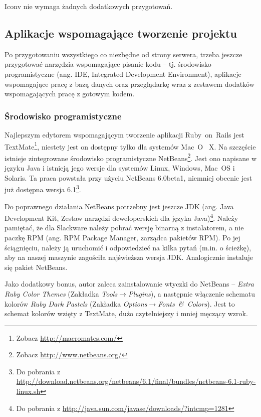 \documentclass[a4paper,12pt,oneside]{report}
\begin{document}
Iconv nie wymaga żadnych dodatkowych przygotowań.

\subsection{Aplikacje wspomagające tworzenie projektu}
\label{sub:ide}
Po przygotowaniu wszystkiego co niezbędne od strony serwera, trzeba jeszcze przygotować narzędzia wspomagające pisanie kodu -- tj. środowisko programistyczne (ang. IDE, Integrated Development Environment), aplikacje wspomagające pracę z bazą danych oraz przeglądarkę wraz z zestawem dodatków wspomagających pracę z gotowym kodem.

\subsubsection{Środowisko programistyczne}
\label{subsub:ide}
Najlepszym edytorem wspomagającym tworzenie aplikacji Ruby~on~Rails jest TextMate\footnote{Zobacz \url{http://macromates.com/}}, niestety jest on dostępny tylko dla systemów Mac~O~ X. Na szczęście istnieje zintegrowane środowisko programistyczne NetBeans\footnote{Zobacz \url{http://www.netbeans.org/}}. Jest ono napisane w języku Java i istnieją jego wersje dla systemów Linux, Windows, Mac~OS i Solaris. Ta praca powstała przy użyciu NetBeans 6.0beta1, niemniej obecnie jest już dostępna wersja 6.1\footnote{Do pobrania z \url{http://download.netbeans.org/netbeans/6.1/final/bundles/netbeans-6.1-ruby-linux.sh}}.

Do poprawnego działania NetBeans potrzebny jest jeszcze JDK (ang. Java Development Kit, Zestaw narzędzi deweloperskich dla języka Java)\footnote{Do pobrania z \url{http://java.sun.com/javase/downloads/?intcmp=1281}}. Należy pamiętać, że dla Slackware należy pobrać wersję binarną z instalatorem, a nie paczkę RPM (ang. RPM Package Manager, zarządca pakietów RPM). Po jej ściągnięciu, należy ją uruchomić i odpowiedzieć na kilka pytań (m.in. o ścieżkę), aby na naszej maszynie zagościła najświeższa wersja JDK. Analogicznie instaluje się pakiet NetBeans.

Jako dodatkowy bonus, autor zaleca zainstalowanie wtyczki do NetBeans -- \emph{Extra Ruby Color Themes} (Zakładka \emph{Tools}$\to$\emph{Plugins}), a następnie włączenie schematu kolorów \emph{Ruby Dark Pastels} (Zakładka \emph{Options}$\to$\emph{Fonts~\&~Colors}). Jest to schemat kolorów wzięty z TextMate, dużo czytelniejszy i mniej męczący wzrok.
\end{document}
